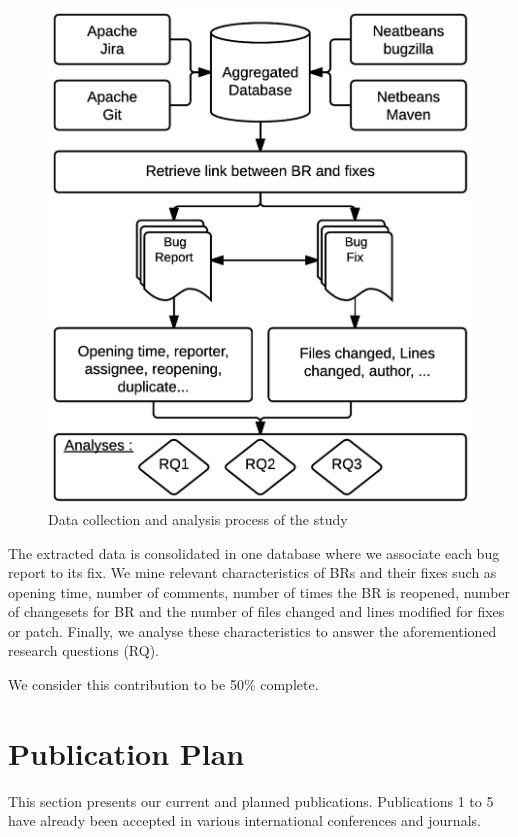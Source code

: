 \begin{figure}[h!]
  \centering
    \includegraphics{media/bug-taxo-flow.png}
    \caption{Data collection and analysis process of the study
    \label{fig:bug-taxo-flow}}
\end{figure}


The extracted data is
consolidated in one database where we associate each bug
report to its fix. We mine relevant characteristics of BRs and
their fixes such as opening time, number of comments,
number of times the BR is reopened, number of changesets
for BR and the number of files changed and lines modified
for fixes or patch. Finally, we analyse these characteristics to
answer the aforementioned research questions (RQ).

We consider this contribution to be 50\% complete.

\section{Publication Plan\label{sec:publication-plan}}

This section presents our current and planned publications.
Publications 1 to 5 have already been accepted in various international conferences and journals.

